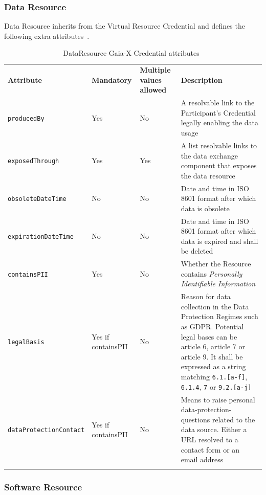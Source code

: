 \subsubsection{Data Resource}

Data Resource inherits from the Virtual Resource Credential and defines the following extra attributes~\cite{gaiax_trust_framework}.

\begin{longtable}{ |p{4cm}|p{2cm}|p{2cm}|p{7cm}| }
    \hhline{----}
    \textbf{Attribute} & \textbf{Mandatory} & \textbf{Multiple values allowed} & \textbf{Description}\\
    \hhline{----}
    \texttt{producedBy} & Yes & No & A resolvable link to the Participant's Credential legally enabling the data usage\\
    \hhline{----}
    \texttt{exposedThrough} & Yes & Yes & A list resolvable links to the data exchange component that exposes the data resource\\
    \hhline{----}
    \texttt{obsoleteDateTime} & No & No & Date and time in ISO 8601 format after which data is obsolete\\
    \hhline{----}
    \texttt{expirationDateTime} & No & No & Date and time in ISO 8601 format after which data is expired and shall be deleted\\
    \hhline{----}
    \texttt{containsPII} & Yes & No & Whether the Resource contains \textit{Personally Identifiable Information}\\
    \hhline{----}
    \texttt{legalBasis} & Yes if containsPII & No & Reason for data collection in the Data Protection Regimes such as GDPR. Potential legal bases can be article 6, article 7 or article 9.
    It shall be expressed as a string matching \texttt{6.1.[a-f]}, \texttt{6.1.4}, \texttt{7} or \texttt{9.2.[a-j]}\\
    \texttt{dataProtectionContact} & Yes if containsPII & No & Means to raise personal data-protection-questions related to the data source.
    Either a URL resolved to a contact form or an email address\\
    \hhline{----}
    \caption{DataResource Gaia-X Credential attributes~\cite{gaiax_trust_framework}}
    \label{tab:data_resource}
\end{longtable}

\subsubsection{Software Resource}

